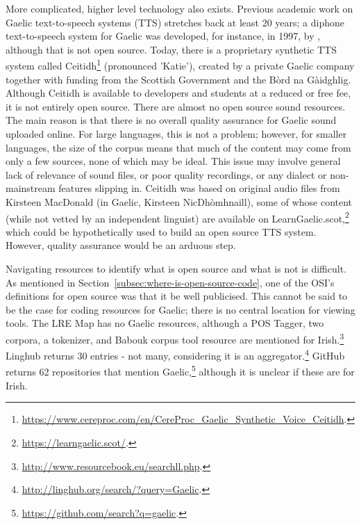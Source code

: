  More complicated, higher level technology also exists. Previous academic work on Gaelic text-to-speech systems (TTS) stretches back at least 20 years; a diphone text-to-speech system for Gaelic was developed, for instance, in 1997, by \citet{wolters1997diphone}, although that is not open source. Today, there is a proprietary synthetic TTS system called Ceitidh\footnote{\href{https://www.cereproc.com/en/CereProc_Gaelic_Synthetic_Voice_Ceitidh}{https://www.cereproc.com/en/CereProc\_Gaelic\_Synthetic\_Voice\_Ceitidh}. } (pronounced 'Katie'), created by a private Gaelic company together with funding from the Scottish Government and the B\`ord na G\`aidghlig. Although Ceitidh is available to developers and students at a reduced or free fee, it is not entirely open source. There are almost no open source sound resources. The main reason is that there is no overall quality assurance for Gaelic sound uploaded online. For large languages, this is not a problem; however, for smaller languages, the size of the corpus means that much of the content may come from only a few sources, none of which may be ideal. This issue may involve general lack of relevance of sound files, or poor quality recordings, or any dialect or non-mainstream features slipping in. Ceitidh was based on original audio files from Kirsteen MacDonald (in Gaelic, Kirsteen NicDh\`{o}mhnaill), some of whose content (while not vetted by an independent linguist) are available on LearnGaelic.scot,\footnote{\href{https://learngaelic.scot/}{https://learngaelic.scot/}. } which could be hypothetically used to build an open source TTS system. However, quality assurance would be an arduous step.

Navigating resources to identify what is open source and what is not is difficult. As mentioned in Section~\ref{subsec:where-is-open-source-code}, one of the OSI's definitions for open source was that it be well publicised. This cannot be said to be the case for coding resources for Gaelic; there is no central location for viewing tools. The LRE Map has no Gaelic resources, although a POS Tagger, two corpora, a tokenizer, and Babouk corpus tool resource are mentioned for Irish.\footnote{\href{http://www.resourcebook.eu/searchll.php}{http://www.resourcebook.eu/searchll.php}. } Linghub returns 30 entries - not many, considering it is an aggregator.\footnote{\href{http://linghub.org/search/?query=Gaelic}{http://linghub.org/search/?query=Gaelic}. } GitHub returns 62 repositories that mention Gaelic,\footnote{\href{https://github.com/search?q=gaelic}{https://github.com/search?q=gaelic}. } although it is unclear if these are for Irish.


